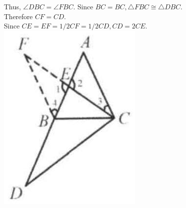 \documentclass{article}
\begin{document}
Thus, \(\angle D B C=\angle F B C\). Since \(B C=B C, \triangle F B C \cong \triangle D B C\).\\
Therefore \(C F=C D\).\\
Since \(C E=E F=1 / 2 C F=1 / 2 C D, C D=2 C E\).\\
\centering
\includegraphics[width=\textwidth]{images/030.jpg}
\end{document}
